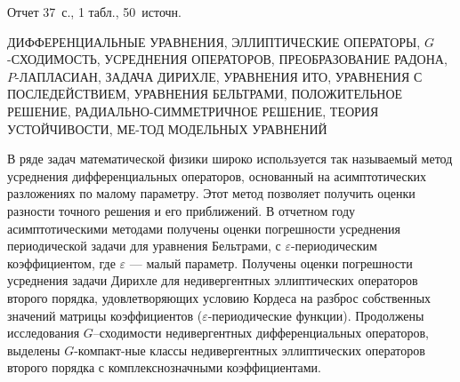 \Referat %

Отчет 37~с., 1 табл., 50~источн.

ДИФФЕРЕНЦИАЛЬНЫЕ УРАВНЕНИЯ,
ЭЛЛИПТИЧЕСКИЕ ОПЕРАТОРЫ,
$G$-СХОДИМОСТЬ, %
УСРЕДНЕНИЯ ОПЕРАТОРОВ,
ПРЕОБРАЗОВАНИЕ РАДОНА,
$P$-ЛАПЛАСИАН,
ЗАДАЧА ДИРИХЛЕ,
УРАВНЕНИЯ ИТО,
УРАВНЕНИЯ С ПОСЛЕДЕЙСТВИЕМ,
УРАВНЕНИЯ БЕЛЬТРАМИ,
ПОЛОЖИТЕЛЬНОЕ РЕШЕНИЕ,
РАДИАЛЬНО-СИММЕТРИЧНОЕ РЕШЕНИЕ,
ТЕОРИЯ УСТОЙЧИВОСТИ,
МЕ-\linebreak ТОД МОДЕЛЬНЫХ УРАВНЕНИЙ



В ряде задач математической физики широко используется так называемый метод усреднения дифференциальных операторов, основанный на асимптотических разложениях по малому параметру. Этот метод позволяет получить оценки разности точного решения и его приближений.
В отчетном году асимптотическими методами получены оценки погрешности усреднения периодической задачи для уравнения Бельтрами, с $\varepsilon$-периодическим коэффициентом, где $\varepsilon$  --- малый параметр.
Получены оценки погрешности усреднения задачи Дирихле для недивергентных эллиптических операторов второго порядка, удовлетворяющих условию Кордеса на разброс собственных значений матрицы коэффициентов ($\varepsilon$-периодические функции).
Продолжены исследования  $G$--сходимости недивергентных дифференциальных операторов, выделены $G$-компакт-\linebreak ные классы недивергентных эллиптических операторов второго порядка с комплекснозначными коэффициентами.








